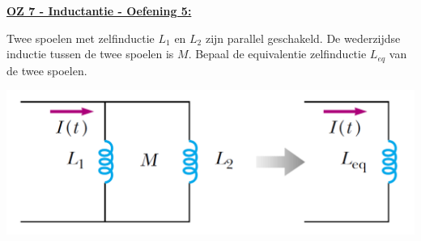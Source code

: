 \textbf{\underline{OZ 7 - Inductantie - Oefening 5:}}
\vspace{0.5cm}

Twee spoelen met zelfinductie $L_1$ en $L_2$ zijn parallel geschakeld. De wederzijdse inductie tussen de twee spoelen is $M$. Bepaal de equivalentie zelfinductie $L_{eq}$ van de twee spoelen.

\begin{center}
    \includegraphics[scale = 0.3]{oz07/resources/Oz7Oef5.png}
\end{center}

